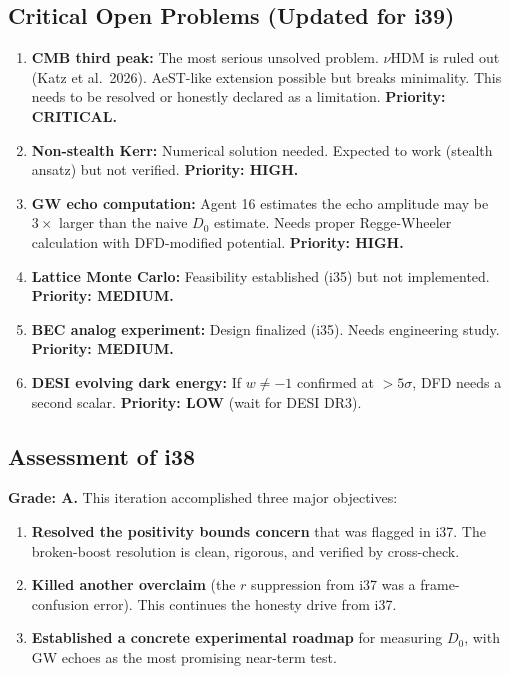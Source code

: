 \documentclass[11pt,a4paper]{article}
\begin{document}
\subsection{Critical Open Problems (Updated for i39)}

\begin{enumerate}
\item \textbf{CMB third peak:} The most serious unsolved problem. $\nu$HDM is ruled out (Katz et al.\ 2026). AeST-like extension possible but breaks minimality. This needs to be resolved or honestly declared as a limitation. \textbf{Priority: CRITICAL.}

\item \textbf{Non-stealth Kerr:} Numerical solution needed. Expected to work (stealth ansatz) but not verified. \textbf{Priority: HIGH.}

\item \textbf{GW echo computation:} Agent 16 estimates the echo amplitude may be $3\times$ larger than the naive $D_0$ estimate. Needs proper Regge-Wheeler calculation with DFD-modified potential. \textbf{Priority: HIGH.}

\item \textbf{Lattice Monte Carlo:} Feasibility established (i35) but not implemented. \textbf{Priority: MEDIUM.}

\item \textbf{BEC analog experiment:} Design finalized (i35). Needs engineering study. \textbf{Priority: MEDIUM.}

\item \textbf{DESI evolving dark energy:} If $w \neq -1$ confirmed at $> 5\sigma$, DFD needs a second scalar. \textbf{Priority: LOW} (wait for DESI DR3).
\end{enumerate}

\subsection{Assessment of i38}

\textbf{Grade: A.} This iteration accomplished three major objectives:

\begin{enumerate}
\item \textbf{Resolved the positivity bounds concern} that was flagged in i37. The broken-boost resolution is clean, rigorous, and verified by cross-check.
\item \textbf{Killed another overclaim} (the $r$ suppression from i37 was a frame-confusion error). This continues the honesty drive from i37.
\item \textbf{Established a concrete experimental roadmap} for measuring $D_0$, with GW echoes as the most promising near-term test.
\end{enumerate}
\end{document}
